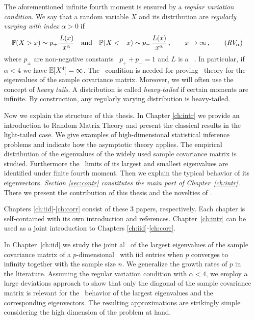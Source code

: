The aforementioned infinite fourth moment is ensured by a {\em regular variation condition}. We say that a random variable $X$ and its distribution are {\em regularly varying with index} $\alpha>0$ if
\begin{equation}\label{eq:regvarch1}
\P(X>x)\sim p_+\,\dfrac{L(x)}{x^{\alpha}}\quad\mbox{and}\quad \P(X<-x) \sim p_-\,\dfrac{L(x)}{x^\alpha}\,,\qquad \xto\,,\tag{$RV_{\alpha}$}
\end{equation}
where $ p_\pm$ are non-negative constants \sth\ $p_++p_-=1$ and $L$ is a \slvary\ \fct . In particular, if $\alpha<4$ we have $\mathbb{E} [X^4]= \infty$. The \regvar\ condition is needed for proving \asy\ theory for the eigenvalues of the sample covariance matrix. Moreover, we will often use the concept of {\em heavy tails}.  A distribution is called {\em heavy-tailed} if certain moments are infinite. By construction, any regularly varying distribution is heavy-tailed.  
\par

Now we explain the structure of this thesis. In Chapter \ref{ch:intr} we provide an introduction to Random Matrix Theory and present the classical results in the light-tailed case. We give examples of high-dimensional statistical inference problems and indicate how the asymptotic theory applies. The empirical distribution of the eigenvalues of the widely used sample covariance matrix is studied. Furthermore the \as~limits of its largest and smallest eigenvalues are identified under finite fourth moment. Then we explain the typical behavior of its eigenvectors. 
{\em Section \ref{sec:contr} constitutes the main part of Chapter~\ref{ch:intr}.} There we present the contribution of this thesis and the novelties of \cite{heiny:mikosch:2015:iid1, davis:mikosch:heiny:xie:20151, heiny:mikosch:2016:corr11}.

Chapters \ref{ch:iid}-\ref{ch:corr} consist of these $3$ papers, respectively. Each chapter is self-contained with its own introduction and references. Chapter~\ref{ch:intr} can be used as a joint introduction to Chapters \ref{ch:iid}-\ref{ch:corr}. 
\par
In Chapter~\ref{ch:iid} we study the joint \ds al \con\ of the largest eigenvalues of the sample covariance matrix
of a $p$-dimensional \ts\ with iid entries when $p$ converges to infinity together with the sample size $n$. We generalize the growth rates of $p$ in the literature. Assuming the regular variation condition with $\alpha<4$, we employ a large deviations approach to show
that only the diagonal of the sample covariance matrix is relevant for the \asy\ behavior of the largest eigenvalues and the corresponding eigenvectors. The resulting approximations are strikingly simple considering the high dimension of the problem at hand.

